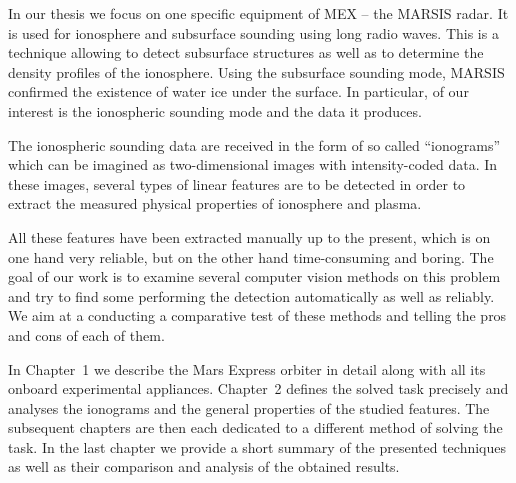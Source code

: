 In our thesis we focus on one specific equipment of MEX -- the MARSIS radar. It is used for ionosphere and subsurface sounding using long radio waves. This is a technique allowing to detect subsurface structures as well as to determine the density profiles of the ionosphere. Using the subsurface sounding mode, MARSIS confirmed the existence of water ice under the surface. In particular, of our interest is the ionospheric sounding mode and the data it produces.

The ionospheric sounding data are received in the form of so called ``ionograms'' which can be imagined as two-dimensional images with intensity-coded data. In these images, several types of linear features are to be detected in order to extract the measured physical properties of ionosphere and plasma.

All these features have been extracted manually up to the present, which is on one hand very reliable, but on the other hand time-consuming and boring. The goal of our work is to examine several computer vision methods on this problem and try to find some performing the detection automatically as well as reliably. We aim at a conducting a comparative test of these methods and telling the pros and cons of each of them.

In Chapter~1 we describe the Mars Express orbiter in detail along with all its onboard experimental appliances. Chapter~2 defines the solved task precisely and analyses the ionograms and the general properties of the studied features. The subsequent chapters are then each dedicated to a different method of solving the task. In the last chapter we provide a short summary of the presented techniques as well as their comparison and analysis of the obtained results.